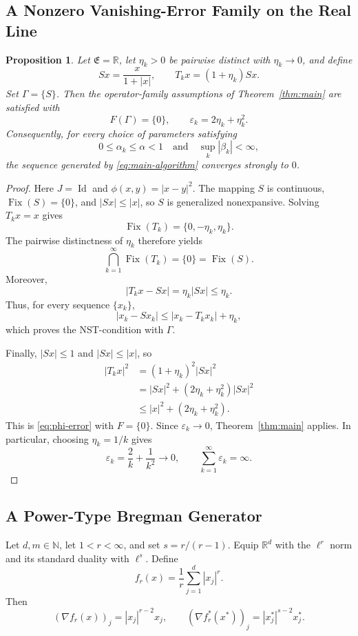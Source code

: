 \documentclass[leqno,12pt]{amsart}
\def\R{\mathbb{R}}
\def\N{\mathbb{N}}
\newtheorem{proposition}[theorem]{Proposition}
\theoremstyle{definition}
\theoremstyle{remark}
\numberwithin{equation}{section}
\newcommand{\E}{\mathfrak{E}}
\newcommand{\Fix}{\operatorname{Fix}}
\newcommand{\Id}{\operatorname{Id}}
\begin{document}
\subsection{A Nonzero Vanishing-Error Family on the Real Line}

\begin{proposition}\label{prop:scalar-example}
Let $\E=\R$, let $\eta_k>0$ be pairwise distinct with $\eta_k\to0$, and define
\[
 Sx=\frac{x}{1+|x|},
 \qquad
 T_kx=(1+\eta_k)Sx.
\]
Set $\Gamma=\{S\}$. Then the operator-family assumptions of
Theorem~\ref{thm:main} are satisfied with
\[
 F(\Gamma)=\{0\},
 \qquad
 \varepsilon_k=2\eta_k+\eta_k^2.
\]
Consequently, for every choice of parameters satisfying
\[
 0\leq\alpha_k\leq\alpha<1
 \quad\text{and}\quad
 \sup_k|\beta_k|<\infty,
\]
the sequence generated by \eqref{eq:main-algorithm} converges strongly to $0$.
\end{proposition}

\begin{proof}
Here $J=\Id$ and $\phi(x,y)=|x-y|^2$. The mapping $S$ is continuous,
$\Fix(S)=\{0\}$, and $|Sx|\leq|x|$, so $S$ is generalized nonexpansive.
Solving $T_kx=x$ gives
\[
 \Fix(T_k)=\{0,-\eta_k,\eta_k\}.
\]
The pairwise distinctness of $\eta_k$ therefore yields
\[
 \bigcap_{k=1}^{\infty}\Fix(T_k)=\{0\}=\Fix(S).
\]
Moreover,
\[
 |T_kx-Sx|=\eta_k|Sx|\leq\eta_k.
\]
Thus, for every sequence $\{x_k\}$,
\[
 |x_k-Sx_k|\leq|x_k-T_kx_k|+\eta_k,
\]
which proves the NST-condition with $\Gamma$.

Finally, $|Sx|\leq1$ and $|Sx|\leq|x|$, so
\begin{align*}
 |T_kx|^2
 &=(1+\eta_k)^2|Sx|^2\\
 &=|Sx|^2+(2\eta_k+\eta_k^2)|Sx|^2\\
 &\leq |x|^2+(2\eta_k+\eta_k^2).
\end{align*}
This is \eqref{eq:phi-error} with $F=\{0\}$. Since
$\varepsilon_k\to0$, Theorem~\ref{thm:main} applies. In particular, choosing
$\eta_k=1/k$ gives
\[
 \varepsilon_k=\frac{2}{k}+\frac{1}{k^2}\longrightarrow0,
 \qquad
 \sum_{k=1}^{\infty}\varepsilon_k=\infty.
\]
\end{proof}

\subsection{A Power-Type Bregman Generator}

Let $d,m\in\N$, let $1<r<\infty$, and set
$s=r/(r-1)$. Equip $\R^d$ with the $\ell^r$ norm and its standard duality
with $\ell^s$. Define
\begin{equation}\label{eq:power-generator}
 f_r(x)=\frac1r\sum_{j=1}^{d}|x_j|^r.
\end{equation}
Then
\[
 (\nabla f_r(x))_j=|x_j|^{r-2}x_j,
 \qquad
 (\nabla f_r^*(x^*))_j=|x_j^*|^{s-2}x_j^*.
\]
\end{document}
